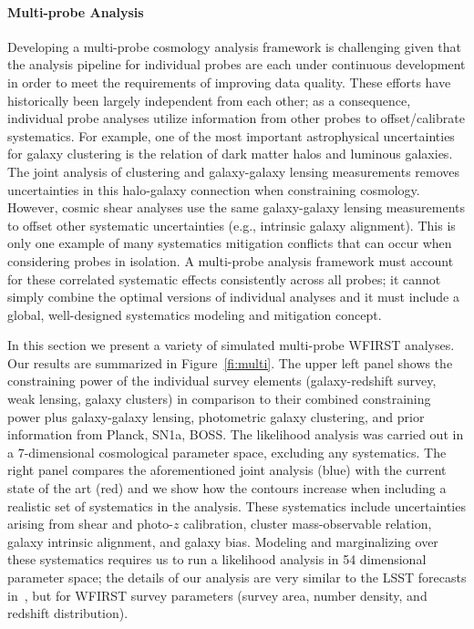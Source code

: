 \paragraph{\CoLi Multi-probe Analysis} Developing a multi-probe cosmology analysis framework is challenging given that the analysis pipeline for individual probes are each under continuous
development in order to meet the requirements of improving data quality. These
efforts have historically been largely independent from each other; as a
consequence, individual probe analyses utilize information from other probes to
offset/calibrate systematics. For example, one of the most important
astrophysical uncertainties for galaxy clustering is the relation of dark matter
halos and luminous galaxies. The joint analysis of clustering and galaxy-galaxy
lensing measurements removes uncertainties in this halo-galaxy connection when
constraining cosmology. However, cosmic shear analyses use the same
galaxy-galaxy lensing measurements to offset other systematic uncertainties
(e.g., intrinsic galaxy alignment). This is only one example of many systematics
mitigation conflicts that can occur when considering probes in isolation. A
multi-probe analysis framework must account for these correlated systematic
effects consistently across all probes; it cannot simply combine the optimal
versions of individual analyses and it must include a global, well-designed
systematics modeling and mitigation concept.

In this section we present a variety of simulated multi-probe WFIRST analyses.
Our results are summarized in Figure~\ref{fi:multi}. The upper left panel shows
the constraining power of the individual survey elements (galaxy-redshift
survey, weak lensing, galaxy clusters) in comparison to their combined
constraining power plus galaxy-galaxy lensing, photometric galaxy clustering,
and prior information from Planck, SN1a, BOSS\@. The likelihood analysis was
carried out in a 7-dimensional cosmological parameter space, excluding any
systematics. The right panel compares the aforementioned joint analysis (blue)
with the current state of the art (red) and we show how the contours increase
when including a realistic set of systematics in the analysis. These systematics
include uncertainties arising from shear and photo-$z$ calibration, cluster
mass-observable relation, galaxy intrinsic alignment, and galaxy bias. Modeling
and marginalizing over these systematics requires us to run a likelihood
analysis in 54 dimensional parameter space; the details of our analysis are very
similar to the LSST forecasts in~\citet{Krause2017}, but for WFIRST survey
parameters (survey area, number density, and redshift distribution).

